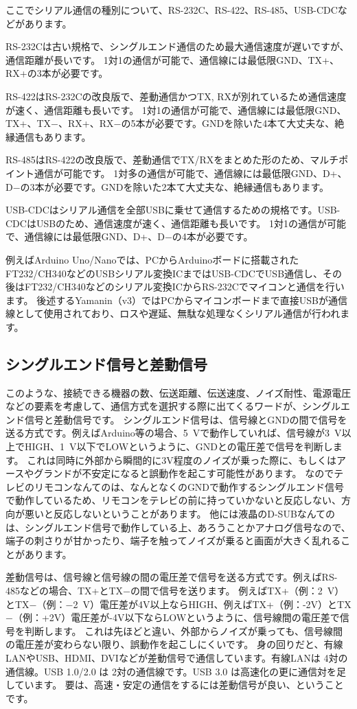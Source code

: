 ここでシリアル通信の種別について、RS-232C、RS-422、RS-485、USB-CDCなどがあります。

RS-232Cは古い規格で、シングルエンド通信のため最大通信速度が遅いですが、通信距離が長いです。
1対1の通信が可能で、通信線には最低限GND、TX+、RX+の3本が必要です。

RS-422はRS-232Cの改良版で、差動通信かつTX, RXが別れているため通信速度が速く、通信距離も長いです。
1対1の通信が可能で、通信線には最低限GND、TX+、TX$-$、RX+、RX$-$の5本が必要です。GNDを除いた4本て大丈夫な、絶縁通信もあります。

RS-485はRS-422の改良版で、差動通信でTX/RXをまとめた形のため、マルチポイント通信が可能です。
1対多の通信が可能で、通信線には最低限GND、D+、D$-$の3本が必要です。GNDを除いた2本て大丈夫な、絶縁通信もあります。

USB-CDCはシリアル通信を全部USBに乗せて通信するための規格です。USB-CDCはUSBのため、通信速度が速く、通信距離も長いです。
1対1の通信が可能で、通信線には最低限GND、D+、D$-$の4本が必要です。

例えばArduino Uno/Nanoでは、PCからArduinoボードに搭載されたFT232/CH340などのUSBシリアル変換ICまではUSB-CDCでUSB通信し、その後はFT232/CH340などのシリアル変換ICからRS-232Cでマイコンと通信を行います。
後述するYamanin（v3）ではPCからマイコンボードまで直接USBが通信線として使用されており、ロスや遅延、無駄な処理なくシリアル通信が行われます。

\subsection{シングルエンド信号と差動信号}
このような、接続できる機器の数、伝送距離、伝送速度、ノイズ耐性、電源電圧などの要素を考慮して、通信方式を選択する際に出てくるワードが、シングルエンド信号と差動信号です。
シングルエンド信号は、信号線とGNDの間で信号を送る方式です。例えばArduino等の場合、\qty{5}{\V}で動作していれば、信号線が\qty{3}{\V}以上でHIGH、\qty{1}{\V}以下でLOWというように、GNDとの電圧差で信号を判断します。
これは同時に外部から瞬間的に3V程度のノイズが乗った際に、もしくはアースやグランドが不安定になると誤動作を起こす可能性があります。
なのでテレビのリモコンなんてのは、なんとなくのGNDで動作するシングルエンド信号で動作しているため、リモコンをテレビの前に持っていかないと反応しない、方向が悪いと反応しないということがあります。
他には液晶のD-SUBなんてのは、シングルエンド信号で動作している上、あろうことかアナログ信号なので、端子の刺さりが甘かったり、端子を触ってノイズが乗ると画面が大きく乱れることがあります。

差動信号は、信号線と信号線の間の電圧差で信号を送る方式です。例えばRS-485などの場合、TX+とTX$-$の間で信号を送ります。
例えばTX+（例：\qty[print-implicit-plus]{+2}{\V}）とTX$-$（例：\qty{-2}{\V}）電圧差が4V以上ならHIGH、例えばTX+（例：-2V）とTX$-$（例：+2V）電圧差が-4V以下ならLOWというように、信号線間の電圧差で信号を判断します。
これは先ほどと違い、外部からノイズが乗っても、信号線間の電圧差が変わらない限り、誤動作を起こしにくいです。
身の回りだと、有線LANやUSB、HDMI、DVIなどが差動信号で通信しています。有線LANは 4対の通信線。USB 1.0/2.0 は 2対の通信線です。USB 3.0 は高速化の更に通信対を足しています。
要は、高速・安定の通信をするには差動信号が良い、ということです。

